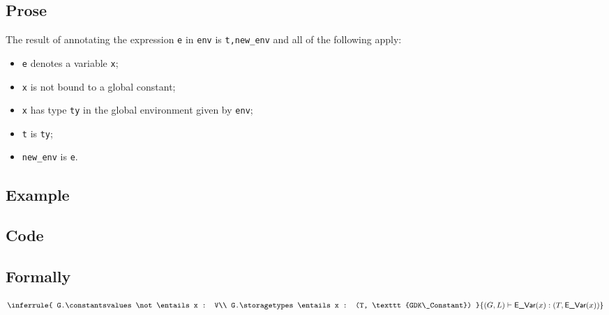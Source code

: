 \documentclass{book}
\begin{document}
  \subsection{Prose}
  The result of annotating the expression \texttt{e} in \texttt{env} is
\texttt{t,new\_env} and all of the following apply:
  \begin{itemize}
  \item \texttt{e} denotes a variable \texttt{x};
  \item \texttt{x} is not bound to a global constant;
  \item \texttt{x} has type \texttt{ty} in the global environment given by \texttt{env};
  \item \texttt{t} is \texttt{ty};
  \item \texttt{new\_env} is \texttt{e}.
  \end{itemize}

  \subsection{Example}

  \subsection{Code}

\begin{emptyformal}
  \subsection{Formally}
  
\begin{comment}
ROMAN: This rule is problematic since it uses a negative premise. Using negative premises requires specific rule ordering strategies, which we probably don't want. Also, I don't understand the rationale for this rule.
\end{comment}
\[
\inferrule{
  G.\constantsvalues \not\entails x : V\\
  G.\storagetypes \entails x : (T, \texttt{GDK\_Constant})
  }
{(G,L) \entails \evar(x) : (T, \evar(x))}
\]

\end{emptyformal}

\end{document}
